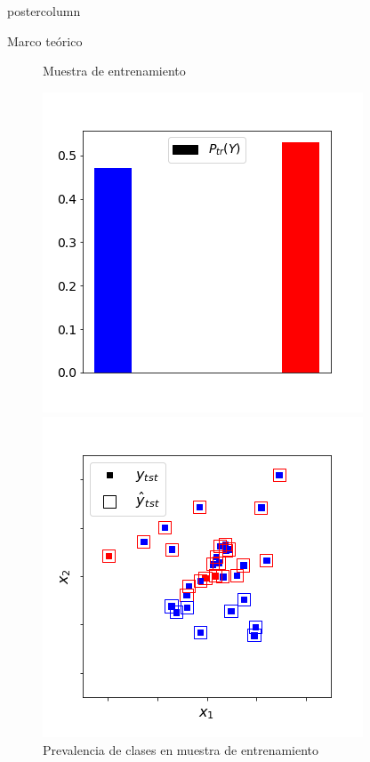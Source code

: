 \documentclass{beamer}
\begin{document}
\begin{frame}
\begin{columns}
\begin{column}{.43\textwidth}
\begin{beamercolorbox}[center]{postercolumn}
\begin{minipage}{.98\textwidth}
{\begin{myblock}{Marco teórico}
\begin{figure}
\begin{minipage}{0.45\textwidth}
								\caption{Muestra de entrenamiento}
							\end{minipage}
							\hfill
							\begin{minipage}{0.45\textwidth}
								\centering\includegraphics[width=0.85\textwidth]{../plots_teoria/cambios_train_barplot.png}
								\caption{Prevalencia de clases en muestra de entrenamiento}
							\end{minipage}
							\medskip
							\begin{minipage}{0.45\textwidth}
								\centering\includegraphics[width=0.85\textwidth]{../plots_teoria/cambios_test_scatterplot.png}

\end{minipage}
\end{figure}
\end{myblock}}
\end{minipage}
\end{beamercolorbox}
\end{column}
\end{columns}
\end{frame}
\end{document}
